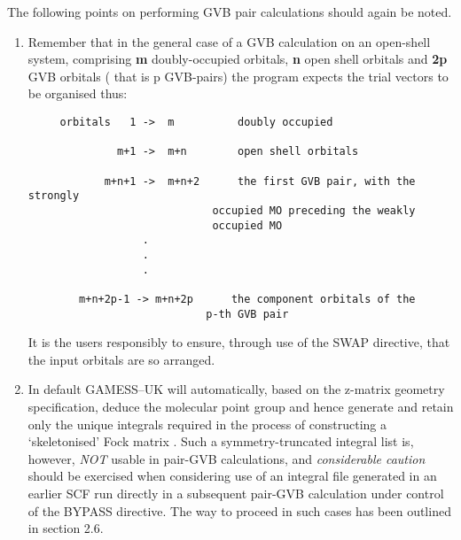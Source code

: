 \documentclass[11pt,fleqn]{article}
\begin{document}
The following points on performing GVB pair calculations
should again be noted.
\begin{enumerate}
\item Remember that in the general case of a GVB \cite{bobrow}
calculation on an open-shell system,
comprising {\bf m} doubly-occupied orbitals, {\bf n} open shell orbitals
and {\bf 2p} GVB orbitals ( that is p GVB-pairs)
the program expects the trial vectors to be organised thus:

{
\footnotesize
\begin{verbatim}
     orbitals   1 ->  m          doubly occupied

              m+1 ->  m+n        open shell orbitals

            m+n+1 ->  m+n+2      the first GVB pair, with the strongly
                             occupied MO preceding the weakly
                             occupied MO
                  .
                  .
                  .

        m+n+2p-1 -> m+n+2p      the component orbitals of the
                            p-th GVB pair
\end{verbatim}
}

It is the users responsibly to ensure, through use of the
SWAP directive, that the input orbitals are so arranged.

\item  In default GAMESS--UK will
automatically, based on the z-matrix geometry specification, deduce
the molecular point group and hence generate and retain only the
unique integrals required in the process of constructing a
`skeletonised' Fock matrix  \cite{dupuis}.
Such a symmetry-truncated integral list
is, however, {\em NOT}  usable in pair-GVB calculations, and
{\em considerable caution}  should be exercised when considering use
of an integral file generated in an earlier SCF run  directly in
a subsequent pair-GVB calculation under control of the BYPASS directive.
The way to proceed in such cases has been outlined in section 2.6.

\end{enumerate}
\end{document}
